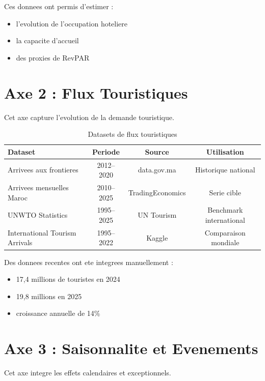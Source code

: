 \documentclass[12pt,a4paper]{report}
\begin{document}
Ces donnees ont permis d'estimer :

\begin{itemize}
    \item l'evolution de l'occupation hoteliere
    \item la capacite d'accueil
    \item des proxies de RevPAR
\end{itemize}

\section{Axe 2 : Flux Touristiques}

Cet axe capture l'evolution de la demande touristique.

\begin{table}[H]
\centering
\small
\begin{tabular}{lccc}
\toprule
Dataset & Periode & Source & Utilisation \\
\midrule
Arrivees aux frontieres & 2012--2020 & data.gov.ma & Historique national \\
Arrivees mensuelles Maroc & 2010--2025 & TradingEconomics & Serie cible \\
UNWTO Statistics & 1995--2025 & UN Tourism & Benchmark international \\
International Tourism Arrivals & 1995--2022 & Kaggle & Comparaison mondiale \\
\bottomrule
\end{tabular}
\caption{Datasets de flux touristiques}
\end{table}

Des donnees recentes ont ete integrees manuellement :

\begin{itemize}
    \item 17,4 millions de touristes en 2024
    \item 19,8 millions en 2025
    \item croissance annuelle de 14\%
\end{itemize}

\section{Axe 3 : Saisonnalite et Evenements}

Cet axe integre les effets calendaires et exceptionnels.
\end{document}
